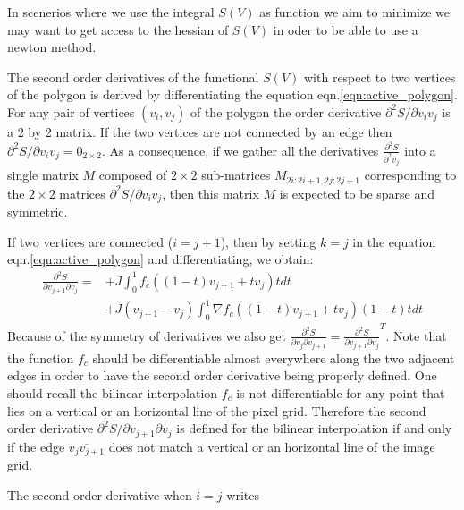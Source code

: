 \documentclass[11pt]{article}
\begin{document}
In scenerios where we use the integral $S(V)$ as function we aim to minimize we may want to get access to the hessian of $S(V)$ in oder to be able to use a newton method. 

        The second order derivatives of the functional $S(V)$ with respect to two vertices of the polygon is derived by differentiating the equation eqn.\ref{eqn:active_polygon}. For any pair of vertices $(v_i,v_j)$ of the polygon the   order derivative ${\partial^2 S}/{\partial v_iv_j}$ is a 2 by 2 matrix. If the two vertices are not connected by an edge then ${\partial^2 S}/{\partial v_iv_j}= 0_{2\times2}$. As a consequence, if we gather all the derivatives $\frac{\partial^2 S}{\partial^2 v_j}$ into a single matrix $M$ composed of $2\times2$ sub-matrices $M_{2i:2i+1,2j:2j+1}$ corresponding to the $2\times 2$ matrices ${\partial^2 S}/{\partial v_iv_j}$, then this matrix $M$ is expected to be sparse and symmetric.

If two vertices are connected ($i=j+1$), then by setting $k=j$ in the equation eqn.\ref{eqn:active_polygon} and differentiating, we obtain: 
\begin{equation}
\begin{split}
\frac{\partial^2 S}{\partial v_{j+1}\partial v_j}=
&+J\int_0^1 f_c((1-t)v_{j+1}+tv_{j})tdt\\
&+J(v_{j+1}-v_{j})\int_0^1 \nabla f_c((1-t)v_{j+1}+tv_{j})(1-t)tdt
\end{split}
\label{eqn:second_order_derivative_qj_plus_one_qj}
\end{equation}
Because of the symmetry of derivatives we also get $\frac{\partial^2 S}{\partial v_{j}\partial v_{j+1}}=\frac{\partial^2 S}{\partial v_{j+1}\partial v_j}^T$. Note that the function $f_c$ should be differentiable almost everywhere along the two adjacent edges in order to have the second order derivative being properly defined. One should recall the bilinear interpolation $f_c$ is not differentiable for any point that lies on a vertical or an horizontal line of the pixel grid. Therefore the second order derivative ${\partial^2 S}/{\partial v_{j+1}\partial v_j}$  is defined for the bilinear interpolation if and only if the  edge $\overline{v_j v_{j+1}}$ does not match a vertical or an horizontal line of the image grid.

The second order derivative when $i=j$ writes 
\end{document}
